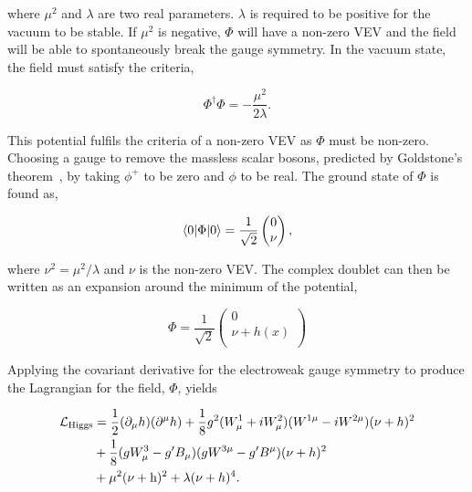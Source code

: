 where $\mu^2$ and $\lambda$ are two real parameters. 
$\lambda$ is required to be positive for the vacuum to be stable.
If $\mu^2$ is negative, $\Phi$ will have a non-zero \ac{VEV} and the field will be able to spontaneously break the gauge symmetry.
In the vacuum state, the field must satisfy the criteria,

\begin{equation}
\Phi^{\dagger} \Phi = -\frac{\mu^2}{2\lambda}.
\end{equation}

This potential fulfils the criteria of a non-zero \ac{VEV} as $\Phi$ must be non-zero. 
Choosing a gauge to remove the massless scalar bosons, predicted by Goldstone's theorem~\cite{Goldstone:1961eq}, by taking $\phi^+$ to be zero and $\phi$ to be real.
The ground state of $\Phi$ is found as,

\begin{equation}
\braket{0|\Phi|0} = \frac{1}{\sqrt{2}}
	\begin{pmatrix} 
		0 \\
		\nu \\
	\end{pmatrix},
\end{equation}

where $\nu^2 = \mu^2 / \lambda$ and $\nu$ is the non-zero \ac{VEV}.
The complex doublet can then be written as an expansion around the minimum of the potential,

\begin{equation}
\Phi = \frac{1}{\sqrt{2}}
	\begin{pmatrix} 
		0 \\
		\nu + h(x)\\
	\end{pmatrix}
\end{equation}

Applying the covariant derivative for the electroweak gauge symmetry to produce the Lagrangian for the field, $\Phi$, yields

\begin{align}
\begin{split}
\mathcal{L}_{\text{Higgs}} &= \frac{1}{2}(\partial_{\mu}h)(\partial^{\mu}h) + \frac{1}{8} g^{2} (W_{\mu}^{1} + i W_{\mu}^{2})(W^{1\mu} - i W^{2\mu})(\nu + h)^2 \\
&+ \frac{1}{8} (g W_{\mu}^{3} - g' B_{\mu})(g W^{3\mu} - g' B^{\mu})(\nu + h)^2  \\
&+ \mu^2 (\nu + {\text{h}})^2 + \lambda (\nu + h)^4.
\end{split}
\end{align}

